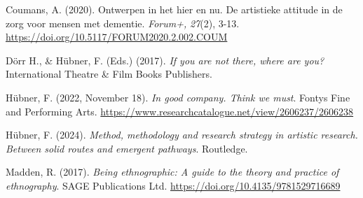 \documentclass[authordate, empirical]{jote-new-article}
\begin{document}
	Coumans, A. (2020). Ontwerpen in het hier en nu. De artistieke attitude in de zorg voor mensen met dementie. \emph{Forum+,} \emph{27}(2), 3-13. \url{https://doi.org/10.5117/FORUM2020.2.002.COUM}







	Dörr H., \& Hübner, F. (Eds.) (2017). \emph{If you are not there, where are you?} International Theatre \& Film Books Publishers.







	Hübner, F. (2022, November 18). \emph{In good company. Think we must}. Fontys Fine and Performing Arts. \url{https://www.researchcatalogue.net/view/2606237/2606238}







	Hübner, F. (2024). \emph{Method, methodology and research strategy in artistic research. Between solid routes and emergent pathways}. Routledge.







	Madden, R. (2017). \emph{Being ethnographic: A guide to the theory and practice of ethnography}. SAGE Publications Ltd. \url{https://doi.org/10.4135/9781529716689}
\end{document}
